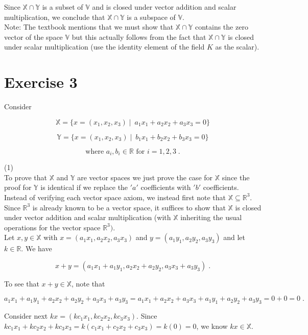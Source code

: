 \documentclass[11pt]{article}
\begin{document}
Since $\mathbb{X} \cap \mathbb{Y}$ is a subset of $\mathbb{V}$ and is closed under vector addition and scalar multiplication, we conclude that $\mathbb{X} \cap \mathbb{Y}$ is a subspace of $\mathbb{V}$.\\

Note: The textbook mentions that we must show that $\mathbb{X} \cap \mathbb{Y}$ contains the zero vector of the space $\mathbb{V}$ but this actually follows from the fact that $\mathbb{X} \cap \mathbb{Y}$ is closed under scalar multiplication (use the identity element of the field $K$ as the scalar).

\section*{Exercise 3}

Consider

$$\mathbb{X} = \{x = (x_1,x_2,x_3) \; | \; \ a_1x_1 + a_2x_2 + a_3x_3 = 0\}$$

$$\mathbb{Y} = \{x = (x_1,x_2,x_3) \; | \; \ b_1x_1 + b_2x_2 + b_3x_3 = 0\}$$

$$\text{where } a_i,b_i \in \mathbb{R} \text{ for } i = 1,2,3 \;.$$

(1)\\

To prove that $\mathbb{X}$ and $\mathbb{Y}$ are vector spaces we just prove the case for $\mathbb{X}$ since the proof for $\mathbb{Y}$ is identical if we replace the $'a'$ coefficients with $'b'$ coefficients. \\

Instead of verifying each vector space axiom, we instead first note that $\mathbb{X} \subseteq \mathbb{R}^3$. Since $\mathbb{R}^3$ is already known to be a vector space, it suffices to show that $\mathbb{X}$ is closed under vector addition and scalar multiplication (with $\mathbb{X}$ inheriting the usual operations for the vector space $\mathbb{R}^3)$.\\

Let $x,y \in \mathbb{X}$ with $x = (a_1x_1, a_2x_2, a_3x_3)$ and $y = (a_1y_1,a_2y_2, a_3y_3)$ and let $k \in \mathbb{R}$. We have

$$ x+y = (a_1x_1 + a_1y_1, a_2x_2 + a_2y_2, a_3x_3 + a_3y_3)\;.$$

To see that $x+y \in \mathbb{X}$, note that

$$ a_1x_1 + a_1y_1 + a_2x_2 + a_2y_2 + a_3x_3 + a_3y_3 = a_1x_1 + a_2x_2 +a_3x_3 + a_1y_1 + a_2y_2 + a_3y_3 = 0 + 0 = 0 \;.$$

Consider next $kx = (kc_1x_1, kc_2x_2, kc_3x_3)$. Since $kc_1x_1 + kc_2x_2 + kc_3x_3 = k(c_1x_1 + c_2x_2 + c_3x_3) = k(0) = 0$, we know $kx \in \mathbb{X}$. \\
\end{document}
